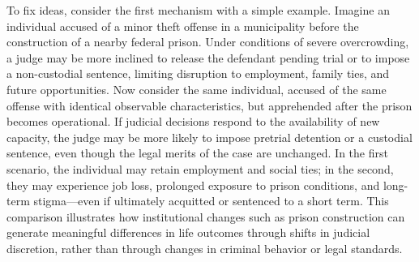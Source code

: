 To fix ideas, consider the first mechanism with a simple example. Imagine an individual accused of a minor theft offense in a municipality before the construction of a nearby federal prison. Under conditions of severe overcrowding, a judge may be more inclined to release the defendant pending trial or to impose a non-custodial sentence, limiting disruption to employment, family ties, and future opportunities. Now consider the same individual, accused of the same offense with identical observable characteristics, but apprehended after the prison becomes operational. If judicial decisions respond to the availability of new capacity, the judge may be more likely to impose pretrial detention or a custodial sentence, even though the legal merits of the case are unchanged. In the first scenario, the individual may retain employment and social ties; in the second, they may experience job loss, prolonged exposure to prison conditions, and long-term stigma—even if ultimately acquitted or sentenced to a short term. This comparison illustrates how institutional changes such as prison construction can generate meaningful differences in life outcomes through shifts in judicial discretion, rather than through changes in criminal behavior or legal standards. 